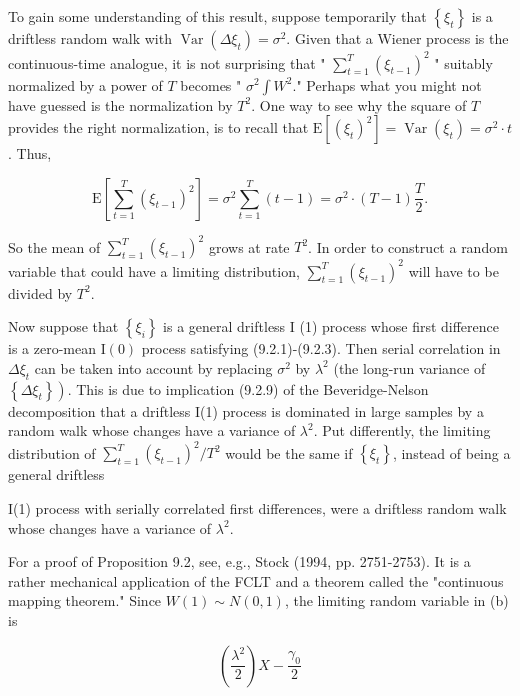 \documentclass[10pt]{article}
\begin{document}
To gain some understanding of this result, suppose temporarily that $\left\{\xi_{t}\right\}$ is a driftless random walk with $\operatorname{Var}\left(\Delta \xi_{t}\right)=\sigma^{2}$. Given that a Wiener process is the continuous-time analogue, it is not surprising that " $\sum_{t=1}^{T}\left(\xi_{t-1}\right)^{2}$ " suitably normalized by a power of $T$ becomes " $\sigma^{2} \int W^{2}$." Perhaps what you might not have guessed is the normalization by $T^{2}$. One way to see why the square of $T$ provides the right normalization, is to recall that $\mathrm{E}\left[\left(\xi_{t}\right)^{2}\right]=\operatorname{Var}\left(\xi_{t}\right)=\sigma^{2} \cdot t$. Thus,


\begin{equation*}
\mathrm{E}\left[\sum_{t=1}^{T}\left(\xi_{t-1}\right)^{2}\right]=\sigma^{2} \sum_{t=1}^{T}(t-1)=\sigma^{2} \cdot(T-1) \frac{T}{2} . \tag{9.2.18}
\end{equation*}


So the mean of $\sum_{t=1}^{T}\left(\xi_{t-1}\right)^{2}$ grows at rate $T^{2}$. In order to construct a random variable that could have a limiting distribution, $\sum_{t=1}^{T}\left(\xi_{t-1}\right)^{2}$ will have to be divided by $T^{2}$.

Now suppose that $\left\{\xi_{i}\right\}$ is a general driftless I (1) process whose first difference is a zero-mean $\mathrm{I}(0)$ process satisfying (9.2.1)-(9.2.3). Then serial correlation in $\Delta \xi_{t}$ can be taken into account by replacing $\sigma^{2}$ by $\lambda^{2}$ (the long-run variance of $\left.\left\{\Delta \xi_{t}\right\}\right)$. This is due to implication (9.2.9) of the Beveridge-Nelson decomposition that a driftless I(1) process is dominated in large samples by a random walk whose changes have a variance of $\lambda^{2}$. Put differently, the limiting distribution of $\sum_{t=1}^{T}\left(\xi_{t-1}\right)^{2} / T^{2}$ would be the same if $\left\{\xi_{t}\right\}$, instead of being a general driftless

I(1) process with serially correlated first differences, were a driftless random walk whose changes have a variance of $\lambda^{2}$.

For a proof of Proposition 9.2, see, e.g., Stock (1994, pp. 2751-2753). It is a rather mechanical application of the FCLT and a theorem called the "continuous mapping theorem." Since $W(1) \sim N(0,1)$, the limiting random variable in (b) is


\begin{equation*}
\left(\frac{\lambda^{2}}{2}\right) X-\frac{\gamma_{0}}{2} \tag{9.2.19}
\end{equation*}
\end{document}
